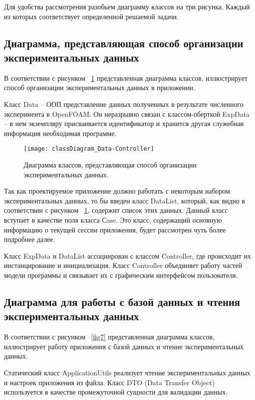 \documentclass[14pt]{extreport}
\begin{document}
Для удобства рассмотрения разобьем диаграмму классов на три рисунка. Каждый из которых соответствует определенной решаемой задачи. 

\subsection{Диаграмма, представляющая способ организации экспериментальных данных}

В соответствии с рисунком ~\ref{fig6} представленная диаграмма классов, иллюстрирует способ организации экспериментальных данных в приложении. 

Класс Data -- ООП представление данных полученных в результате численного эксперимента в OpenFOAM. Он неразрывно связан с классом-оберткой ExpData -- в нем экземпляру присваивается идентификатор и хранится другая служебная информация необходимая программе. 

\begin{figure}[H]
\centerline{\texttt{[image: classDiagram\_Data-Controller]}}
\caption{Диаграмма классов, представляющая способ организации экспериментальных данных.}
\label{fig6}
\end{figure}

Так как проектируемое приложение должно работать с некоторым набором экспериментальных данных, то бы введен класс DataList, который, как видно в соответствии с рисунком ~\ref{fig6}, содержит список этих данных. Данный класс вступает в качестве поля класса Сase. Это класс, содержащий основную информацию о текущей сессии приложения, будет рассмотрен чуть более подробнее далее. 

Класс ExpData и DataList ассоциирован с классом Controller, где происходит их инстанцирование и инициализация. Класс Controller объединяет работу частей модели программы и связывает их с графическим интерфейсом пользователя. 

\subsection{Диаграмма для работы с базой данных и чтения экспериментальных данных}
В соответствии с рисунком ~\ref{fig7} представленная диаграмма классов, иллюстрирует работу приложения с базой данных и чтение экспериментальных данных.

Статический класс ApplicationUtils реализует чтение экспериментальных данных и настроек приложения из файла. Класс DTO (Data Transfer Object) используется в качестве промежуточной сущности для валидации данных.
\end{document}
